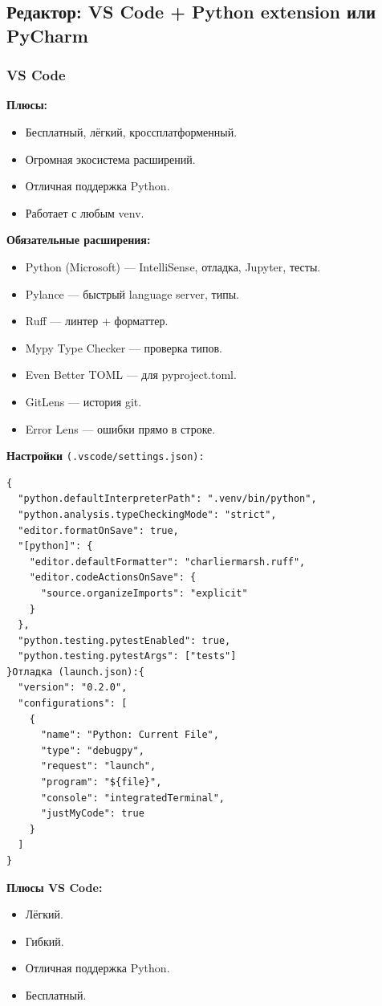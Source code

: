 \subsection{ Редактор: VS Code + Python extension или PyCharm}
\subsubsection{ VS Code}

\textbf{Плюсы:}
\begin{itemize}
\item Бесплатный, лёгкий, кроссплатформенный.
\item Огромная экосистема расширений.
\item Отличная поддержка Python.
\item Работает с любым venv.
\end{itemize}

\textbf{Обязательные расширения:}
\begin{itemize}
\item Python (Microsoft) — IntelliSense, отладка, Jupyter, тесты.
\item Pylance — быстрый language server, типы.
\item Ruff — линтер + форматтер.
\item Mypy Type Checker — проверка типов.
\item Even Better TOML — для pyproject.toml.
\item GitLens — история git.
\item Error Lens — ошибки прямо в строке.
\end{itemize}

\textbf{Настройки} \texttt{(.vscode/settings.json):}
\begin{lstlisting}
{
  "python.defaultInterpreterPath": ".venv/bin/python",
  "python.analysis.typeCheckingMode": "strict",
  "editor.formatOnSave": true,
  "[python]": {
    "editor.defaultFormatter": "charliermarsh.ruff",
    "editor.codeActionsOnSave": {
      "source.organizeImports": "explicit"
    }
  },
  "python.testing.pytestEnabled": true,
  "python.testing.pytestArgs": ["tests"]
}Отладка (launch.json):{
  "version": "0.2.0",
  "configurations": [
    {
      "name": "Python: Current File",
      "type": "debugpy",
      "request": "launch",
      "program": "${file}",
      "console": "integratedTerminal",
      "justMyCode": true
    }
  ]
}
\end{lstlisting}

\textbf{Плюсы VS Code:}
\begin{itemize}
\item Лёгкий.
\item Гибкий.
\item Отличная поддержка Python.
\item Бесплатный.
\end{itemize}

